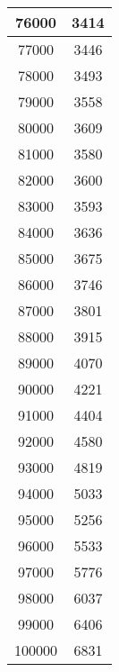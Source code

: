 \documentclass[ngerman,a4paper]{report}
\begin{document}
\begin{tabular}{|c|c|}
76000 & 3414\\
\hline
77000 & 3446\\
\hline
78000 & 3493\\
\hline
79000 & 3558\\
\hline
80000 & 3609\\
\hline
81000 & 3580\\
\hline
82000 & 3600\\
\hline
83000 & 3593\\
\hline
84000 & 3636\\
\hline
85000 & 3675\\
\hline
86000 & 3746\\
\hline
87000 & 3801\\
\hline
88000 & 3915\\
\hline
89000 & 4070\\
\hline
90000 & 4221\\
\hline
91000 & 4404\\
\hline
92000 & 4580\\
\hline
93000 & 4819\\
\hline
94000 & 5033\\
\hline
95000 & 5256\\
\hline
96000 & 5533\\
\hline
97000 & 5776\\
\hline
98000 & 6037\\
\hline
99000 & 6406\\
\hline
100000 & 6831\\
\hline
\end{tabular}
\end{document}

